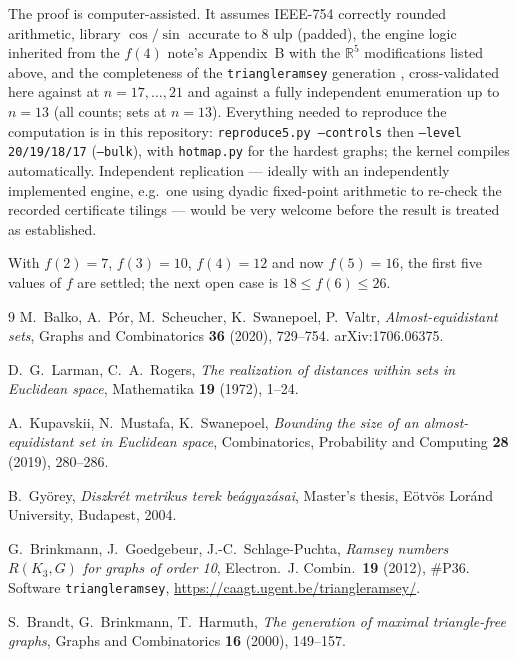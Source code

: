 \documentclass[11pt]{article}
\newcommand{\R}{\mathbb{R}}
\begin{document}
The proof is computer-assisted. It assumes IEEE-754 correctly rounded
arithmetic, library $\cos/\sin$ accurate to $8$ ulp (padded), the engine
logic inherited from the $f(4)$ note's Appendix~B with the $\R^5$
modifications listed above, and the completeness of the
\texttt{triangleramsey} generation \cite{BGS}, cross-validated here
against \cite{BPSSV} at $n=17,\dots,21$ and against a fully independent
enumeration up to $n=13$ (all counts; sets at $n=13$). Everything needed
to reproduce the computation is in this repository:
\texttt{reproduce5.py --controls} then \texttt{--level 20/19/18/17}
(\texttt{--bulk}), with \texttt{hotmap.py} for the hardest graphs; the
kernel compiles automatically. Independent replication --- ideally with
an independently implemented engine, e.g.\ one using dyadic fixed-point
arithmetic to re-check the recorded certificate tilings --- would be
very welcome before the result is treated as established.

With $f(2)=7$, $f(3)=10$, $f(4)=12$ and now $f(5)=16$, the first five
values of $f$ are settled; the next open case is
$18\le f(6)\le 26$.

\begin{thebibliography}{9}\small
{} M.~Balko, A.~P\'or, M.~Scheucher, K.~Swanepoel, P.~Valtr,
\emph{Almost-equidistant sets}, Graphs and Combinatorics \textbf{36}
(2020), 729--754. arXiv:1706.06375.

 D.~G.~Larman, C.~A.~Rogers, \emph{The realization of
distances within sets in Euclidean space}, Mathematika \textbf{19}
(1972), 1--24.

 A.~Kupavskii, N.~Mustafa, K.~Swanepoel, \emph{Bounding the
size of an almost-equidistant set in Euclidean space}, Combinatorics,
Probability and Computing \textbf{28} (2019), 280--286.

 B.~Gy\"orey, \emph{Diszkr\'et metrikus terek
be\'agyaz\'asai}, Master's thesis, E\"otv\"os Lor\'and University,
Budapest, 2004.

 G.~Brinkmann, J.~Goedgebeur, J.-C.~Schlage-Puchta,
\emph{Ramsey numbers $R(K_3,G)$ for graphs of order 10}, Electron.\ J.
Combin.\ \textbf{19} (2012), \#P36. Software \texttt{triangleramsey},
\url{https://caagt.ugent.be/triangleramsey/}.

 S.~Brandt, G.~Brinkmann, T.~Harmuth, \emph{The generation
of maximal triangle-free graphs}, Graphs and Combinatorics \textbf{16}
(2000), 149--157.
\end{thebibliography}
\end{document}
